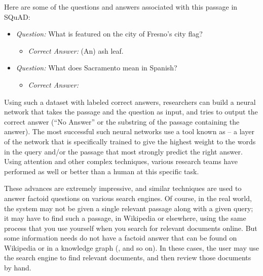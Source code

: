 Here are some of the questions and answers associated with this passage in SQuAD:

\begin{itemize}

\item \emph{Question:} What is featured on the city of Fresno's city flag?

\begin{itemize}

\item \emph{Correct Answer:}  (An) ash leaf.

\end{itemize}

\item  \emph{Question:} What does Sacramento mean in Spanish?

\begin{itemize}

\item  \emph{Correct Answer:} 
 
 \end{itemize}
 
 \end{itemize}
 
 Using such a dataset with labeled correct answers, researchers can build a neural network that takes the passage and the question as input, and tries to output the correct answer (``No Answer'' or the substring of the passage containing the answer).  The most successful such neural networks use a tool known as  -- a layer of the network that is specifically trained to give the highest weight to the words in the query and/or the passage that most strongly predict the right answer.  Using attention and other complex techniques, various research teams have performed as well or better than a human at this specific task.
 
 These advances are extremely impressive, and similar techniques are used to answer factoid questions on various search engines. Of course, in the real world, the system may not be given a single relevant passage along with a given query; it may have to find such a passage, in Wikipedia or elsewhere, using the same process that you use yourself when you search for relevant documents online.  But some information needs do not have a factoid answer that can be found on Wikipedia or in a knowledge graph (, and so on).   In these cases, the user may use the search engine to find relevant documents, and then review those documents by hand.
   

